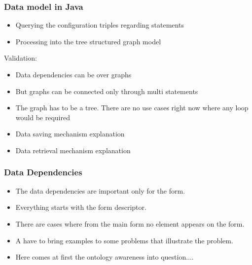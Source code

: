 
\subsubsection{Data model in Java}


\begin{itemize}
	\item Querying the configuration triples regarding statements
	\item Processing into the tree structured graph model
\end{itemize}



Validation:

\begin{itemize}
	\item Data dependencies can be over graphs
	\item But graphs can be connected only through multi statements
	\item The graph has to be a tree. There are no use cases right now where any loop would be required
\end{itemize}


\begin{itemize}
	\item Data saving mechanism explanation
	\item Data retrieval mechanism explanation
\end{itemize}

\subsubsection{Data Dependencies}


\begin{itemize}
	\item The data dependencies are important only for the form. 
	\item Everything starts with the form descriptor.
	\item There are cases where from the main form no element appears on the form.
	\item A have to bring examples to some problems that illustrate the problem.
	\item Here comes at first the ontology awareness into question....
\end{itemize}



